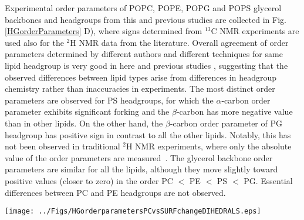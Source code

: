 \documentclass[aps,prl,superscriptaddress,twocolumn]{revtex4}
\begin{document}
Experimental order parameters of POPC, POPE, POPG and POPS glycerol backbones and
headgroups from this and previous studies are collected in Fig. \ref{HGorderParameters} D),
where signs determined from $^{13}$C NMR experiments are used also for the $^2$H NMR data from the literature.
Overall agreement of order parameters determined by different authors and different techniques
for same lipid headgroup is very good in here and previous studies \cite{botan15,ollila16,antila19},
suggesting that the observed differences between lipid types arise from differences in
headgroup chemistry rather than inaccuracies in experiments. 
The most distinct order parameters are observed for PS headgroups,
for which the $\alpha$-carbon order parameter exhibits significant forking
and the $\beta$-carbon has more negative value than in other lipids.
On the other hand, the $\beta$-carbon order parameter of PG headgroup
has positive sign in contrast to all the other lipids.
Notably, this has not been observed in traditional $^2$H NMR experiments,
where only the absolute value of the order parameters are measured~\cite{wohlgemuth80,gally81,borle85}.
The glycerol backbone order parameters are similar for all the lipids, although they move slightly toward
positive values (closer to zero) in the order PC $<$ PE $<$ PS $<$ PG.
Essential differences between PC and PE headgroups are not observed.


\begin{figure*}[bt]
  \centering
  \texttt{[image: ../Figs/HGorderparametersPCvsSURFchangeDIHEDRALS.eps]}
  \caption{\label{changesWITHsurf}
    {\bf A)} Modulation of PC headgroup order parameters and P-N vector angle upon addition of cationic surfactant
    from CHARMM36 simulations compared with experimental data \cite{??}.
    {\bf B)} Changes in PC headgroup conformational ensembles upon increasing amount of positive charge in bilayer,
    characterized by the heavy atom dihedral distributions, from CHARMM36 simulations.
  }
\end{figure*}
\end{document}
